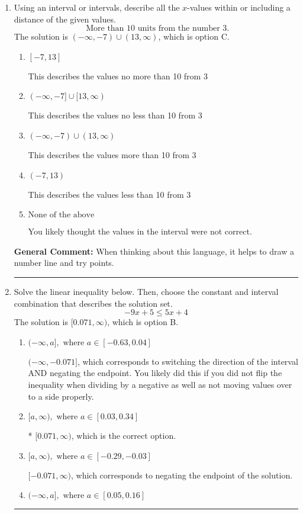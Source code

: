 \documentclass{extbook}[14pt]
\newcommand{\litem}[1]{\item #1

\rule{\textwidth}{0.4pt}}
\begin{document}
\begin{enumerate}\litem{
Using an interval or intervals, describe all the $x$-values within or including a distance of the given values.
\[ \text{ More than } 10 \text{ units from the number } 3. \]The solution is \( (-\infty, -7) \cup (13, \infty) \), which is option C.\begin{enumerate}[label=\Alph*.]
\item \( [-7, 13] \)

This describes the values no more than 10 from 3
\item \( (-\infty, -7] \cup [13, \infty) \)

This describes the values no less than 10 from 3
\item \( (-\infty, -7) \cup (13, \infty) \)

This describes the values more than 10 from 3
\item \( (-7, 13) \)

This describes the values less than 10 from 3
\item \( \text{None of the above} \)

You likely thought the values in the interval were not correct.
\end{enumerate}

\textbf{General Comment:} When thinking about this language, it helps to draw a number line and try points.
}
\litem{
Solve the linear inequality below. Then, choose the constant and interval combination that describes the solution set.
\[ -9x + 5 \leq 5x + 4 \]The solution is \( [0.071, \infty) \), which is option B.\begin{enumerate}[label=\Alph*.]
\item \( (-\infty, a], \text{ where } a \in [-0.63, 0.04] \)

 $(-\infty, -0.071]$, which corresponds to switching the direction of the interval AND negating the endpoint. You likely did this if you did not flip the inequality when dividing by a negative as well as not moving values over to a side properly.
\item \( [a, \infty), \text{ where } a \in [0.03, 0.34] \)

* $[0.071, \infty)$, which is the correct option.
\item \( [a, \infty), \text{ where } a \in [-0.29, -0.03] \)

 $[-0.071, \infty)$, which corresponds to negating the endpoint of the solution.
\item \( (-\infty, a], \text{ where } a \in [0.05, 0.16] \)


\end{enumerate}}
\end{enumerate}
\end{document}
